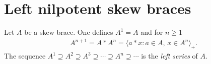 







%	
	



\section{Left nilpotent skew braces}

\begin{definition}
Let $A$ be a skew brace. One defines
$A^1=A$ and for $n\geq1$
\begin{align*}
    & A^{n+1}=A*A^{n}=\langle a*x: a\in A,\,x\in A^{n}\rangle_+.
\end{align*}
The sequence $A^1\supseteq A^2\supseteq A^3\supseteq\cdots\supseteq A^n\supseteq\cdots$
is the \emph{left series} of $A$.
\end{definition}

